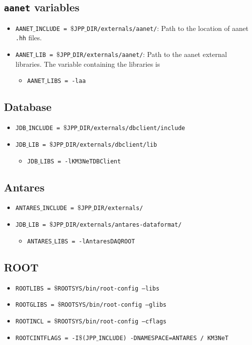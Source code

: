 \documentclass[t]{article}
\begin{document}
\subsection*{{\tt aanet} variables} 
\begin{itemize}
\item {\tt AANET$\_$INCLUDE = $\$$JPP$\_$DIR/externals/aanet/}: Path to the location of aanet {\tt .hh} files. 
\item {\tt AANET$\_$LIB = $\$$JPP$\_$DIR/externals/aanet/}: Path to the aanet external libraries. The variable containing the libraries is
\begin{itemize}
\item {\tt AANET$\_$LIBS = -laa}
\end{itemize} 
\end{itemize}

\subsection*{Database}
\begin{itemize}
\item {\tt JDB$\_$INCLUDE = $\$$JPP$\_$DIR/externals/dbclient/include} 
\item {\tt JDB$\_$LIB = $\$$JPP$\_$DIR/externals/dbclient/lib}
\begin{itemize}
\item {\tt JDB$\_$LIBS = -lKM3NeTDBClient}
\end{itemize} 
\end{itemize}

\subsection*{Antares}
\begin{itemize}
\item {\tt ANTARES$\_$INCLUDE = $\$$JPP$\_$DIR/externals/} 
\item {\tt JDB$\_$LIB = $\$$JPP$\_$DIR/externals/antares-dataformat/}
\begin{itemize}
\item {\tt ANTARES$\_$LIBS = -lAntaresDAQROOT}
\end{itemize} 
\end{itemize}

\subsection*{ROOT}
\begin{itemize}
\item {\tt ROOTLIBS       =  $\$${ROOTSYS}/bin/root-config --libs}
\item {\tt ROOTGLIBS      = $\$${ROOTSYS}/bin/root-config --glibs}
\item {\tt ROOTINCL       = $\$${ROOTSYS}/bin/root-config --cflags}
\item {\tt ROOTCINTFLAGS  = -I$\$$(JPP$\_$INCLUDE) -DNAMESPACE=ANTARES / KM3NeT}

\end{itemize}
%
\end{document}
